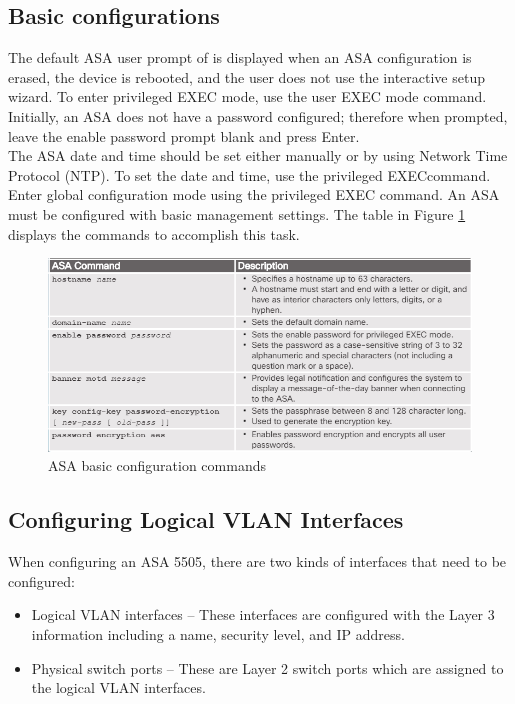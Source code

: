 \subsection{Basic configurations}

The default ASA user prompt of  is displayed when an ASA configuration is erased, the device is rebooted, and the user does not use the interactive setup wizard. To enter privileged EXEC mode, use the  user EXEC mode command. Initially, an ASA does not have a password configured; therefore when prompted, leave the enable password prompt blank and press Enter.\\

The ASA date and time should be set either manually or by using Network Time Protocol (NTP). To set the date and time, use the  privileged EXECcommand. Enter global configuration mode using the  privileged EXEC command. An ASA must be configured with basic management settings. The table in Figure \ref{ASAbasic} displays the commands to accomplish this task.

\begin{figure}[hbtp]
\caption{ASA basic configuration commands}\label{ASAbasic}
\centering
\includegraphics[scale=0.5]{pictures/ASAbasic.PNG}
\end{figure}

\subsection{Configuring Logical VLAN Interfaces}

When configuring an ASA 5505, there are two kinds of interfaces that need to be configured:

\begin{itemize}
\item Logical VLAN interfaces -- These interfaces are configured with the Layer 3 information including a name, security level, and IP address.
\item Physical switch ports -- These are Layer 2 switch ports which are assigned to the logical VLAN interfaces.
\end{itemize}

